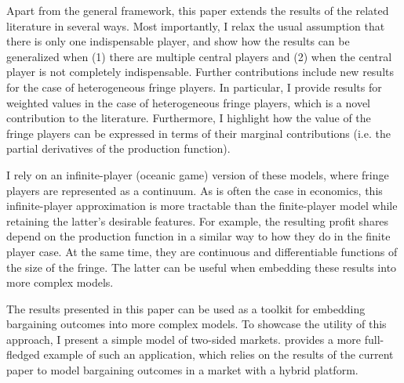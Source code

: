 Apart from the general framework, this paper extends the results of the related literature in several ways.
Most importantly, I relax the usual assumption that there is only one indispensable player, and show how the results can be generalized when (1) there are multiple central players and (2) when the central player is not completely indispensable.
Further contributions include new results for the case of heterogeneous fringe players.
In particular, I provide results for weighted values in the case of heterogeneous fringe players, which is a novel contribution to the literature.
Furthermore, I highlight how the value of the fringe players can be expressed in terms of their marginal contributions (i.e. the partial derivatives of the production function).

I rely on an infinite-player (oceanic game) version of these models, where fringe players are represented as a continuum.
As is often the case in economics, this infinite-player approximation is more tractable than the finite-player model while retaining the latter's desirable features.
For example, the resulting profit shares depend on the production function in a similar way to how they do in the finite player case.
At the same time, they are continuous and differentiable functions of the size of the fringe.
The latter can be useful when embedding these results into more complex models.

The results presented in this paper can be used as a toolkit for embedding bargaining outcomes into more complex models.
To showcase the utility of this approach, I present a simple model of two-sided markets.
\applicationref{} provides a more full-fledged example of such an application, which relies on the results of the current paper to model bargaining outcomes in a market with a hybrid platform.

